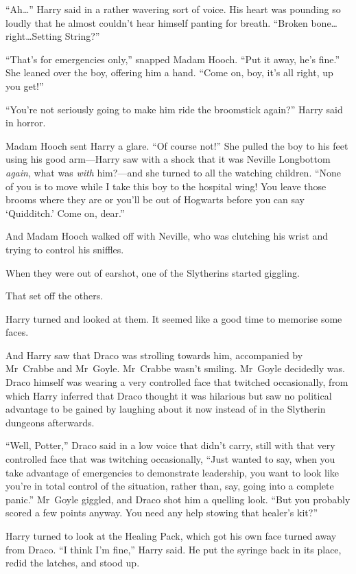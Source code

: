 “Ah…” Harry said in a rather wavering sort of voice. His heart was pounding so loudly that he almost couldn’t hear himself panting for breath.
“Broken bone…right…Setting String?”

“That’s for emergencies only,” snapped Madam Hooch.
“Put it away, he’s fine.” She leaned over the boy, offering him a hand.
“Come on, boy, it’s all right, up you get!”

“You’re not seriously going to make him ride the broomstick again?” Harry said in horror.

Madam Hooch sent Harry a glare.
“Of course not!” She pulled the boy to his feet using his good arm—Harry saw with a shock that it was Neville Longbottom \emph{again}, what was \emph{with} him?—and she turned to all the watching children.
“None of you is to move while I take this boy to the hospital wing! You leave those brooms where they are or you’ll be out of Hogwarts before you can say ‘Quidditch.’ Come on, dear.”

And Madam Hooch walked off with Neville, who was clutching his wrist and trying to control his sniffles.

When they were out of earshot, one of the Slytherins started giggling.

That set off the others.

Harry turned and looked at them. It seemed like a good time to memorise some faces.

And Harry saw that Draco was strolling towards him, accompanied by Mr~Crabbe and Mr~Goyle. Mr~Crabbe wasn’t smiling. Mr~Goyle decidedly was. Draco himself was wearing a very controlled face that twitched occasionally, from which Harry inferred that Draco thought it was hilarious but saw no political advantage to be gained by laughing about it now instead of in the Slytherin dungeons afterwards.

“Well, Potter,” Draco said in a low voice that didn’t carry, still with that very controlled face that was twitching occasionally,
“Just wanted to say, when you take advantage of emergencies to demonstrate leadership, you want to look like you’re in total control of the situation, rather than, say, going into a complete panic.” Mr~Goyle giggled, and Draco shot him a quelling look.
“But you probably scored a few points anyway. You need any help stowing that healer’s kit?”

Harry turned to look at the Healing Pack, which got his own face turned away from Draco.
“I think I’m fine,” Harry said. He put the syringe back in its place, redid the latches, and stood up.

